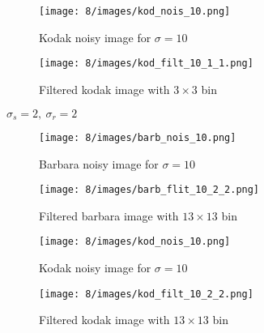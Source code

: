 \documentclass[12pt]{article}
\begin{document}
\begin{itemize}
    \begin{figure}[H]
        \centering
        \begin{minipage}{.45\textwidth}
          \centering
          \texttt{[image: 8/images/kod\_nois\_10.png]}
          \caption*{Kodak noisy image for $\sigma = 10$}
          \label{fig:totalpowervst}
        \end{minipage}
        \begin{minipage}{.45\textwidth}
          \centering
          \texttt{[image: 8/images/kod\_filt\_10\_1\_1.png]}
          \caption*{Filtered kodak image with $3\times 3$ bin}
          \label{fig:totalpower2}
        \end{minipage}
        \label{fig:totalPower}
    \end{figure}
    
    $\sigma_s = 2, \ \sigma_r = 2$
    \begin{figure}[H]
        \centering
        \begin{minipage}{.45\textwidth}
          \centering
          \texttt{[image: 8/images/barb\_nois\_10.png]}
          \caption*{Barbara noisy image for $\sigma = 10$}
          \label{fig:totalpowervst}
        \end{minipage}
        \begin{minipage}{.45\textwidth}
          \centering
          \texttt{[image: 8/images/barb\_flit\_10\_2\_2.png]}
          \caption*{Filtered barbara image with $13\times 13$ bin}
          \label{fig:totalpower2}
        \end{minipage}
        \label{fig:totalPower}
    \end{figure}
    
    \begin{figure}[H]
        \centering
        \begin{minipage}{.45\textwidth}
          \centering
          \texttt{[image: 8/images/kod\_nois\_10.png]}
          \caption*{Kodak noisy image for $\sigma = 10$}
          \label{fig:totalpowervst}
        \end{minipage}
        \begin{minipage}{.45\textwidth}
          \centering
          \texttt{[image: 8/images/kod\_filt\_10\_2\_2.png]}
          \caption*{Filtered kodak image with $13\times 13$ bin}
          \label{fig:totalpower2}
        \end{minipage}
        \label{fig:totalPower}
    \end{figure}
    

\end{itemize}
\end{document}
